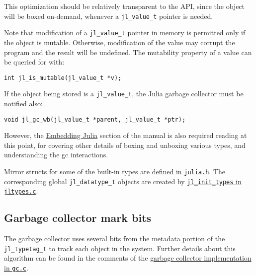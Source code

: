 This optimization should be relatively transparent to the API, since the object will be {\textquotedbl}boxed{\textquotedbl} on-demand, whenever a \texttt{jl\_value\_t} pointer is needed.



Note that modification of a \texttt{jl\_value\_t} pointer in memory is permitted only if the object is mutable. Otherwise, modification of the value may corrupt the program and the result will be undefined. The mutability property of a value can be queried for with:




\begin{lstlisting}
int jl_is_mutable(jl_value_t *v);
\end{lstlisting}



If the object being stored is a \texttt{jl\_value\_t}, the Julia garbage collector must be notified also:




\begin{lstlisting}
void jl_gc_wb(jl_value_t *parent, jl_value_t *ptr);
\end{lstlisting}



However, the \href{@ref}{Embedding Julia} section of the manual is also required reading at this point, for covering other details of boxing and unboxing various types, and understanding the gc interactions.



Mirror structs for some of the built-in types are \href{https://github.com/JuliaLang/julia/blob/master/src/julia.h}{defined in \texttt{julia.h}}. The corresponding global \texttt{jl\_datatype\_t} objects are created by \href{https://github.com/JuliaLang/julia/blob/master/src/jltypes.c}{\texttt{jl\_init\_types} in \texttt{jltypes.c}}.



\hypertarget{660883080955975432}{}


\subsection{Garbage collector mark bits}



The garbage collector uses several bits from the metadata portion of the \texttt{jl\_typetag\_t} to track each object in the system. Further details about this algorithm can be found in the comments of the \href{https://github.com/JuliaLang/julia/blob/master/src/gc.c}{garbage collector implementation in \texttt{gc.c}}.



